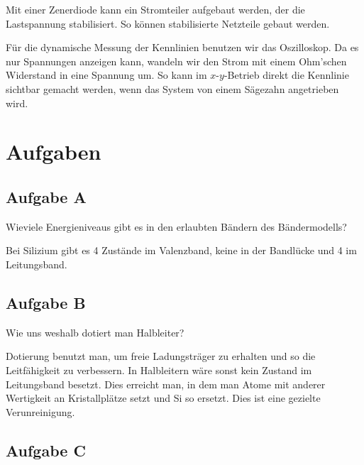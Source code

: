 Mit einer Zenerdiode kann ein Stromteiler aufgebaut werden, der die
Lastspannung stabilisiert. So können stabilisierte Netzteile gebaut werden.

Für die dynamische Messung der Kennlinien benutzen wir das Oszilloskop. Da es
nur Spannungen anzeigen kann, wandeln wir den Strom mit einem Ohm'schen
Widerstand in eine Spannung um. So kann im $x$-$y$-Betrieb direkt die Kennlinie
sichtbar gemacht werden, wenn das System von einem Sägezahn angetrieben wird.


\section{Aufgaben}

\subsection{Aufgabe A}

\begin{problem}
	Wieviele Energieniveaus gibt es in den erlaubten Bändern des Bändermodells?
\end{problem}

Bei Silizium gibt es 4 Zustände im Valenzband, keine in der Bandlücke und 4 im
Leitungsband. \cite[Vorlesung~16, Folie~13]{meschede/physik441}

\subsection{Aufgabe B}

\begin{problem}
	Wie uns weshalb dotiert man Halbleiter?
\end{problem}

Dotierung benutzt man, um freie Ladungsträger zu erhalten und so die
Leitfähigkeit zu verbessern. In Halbleitern wäre sonst kein Zustand im
Leitungsband besetzt. Dies erreicht man, in dem man Atome mit anderer
Wertigkeit an Kristallplätze setzt und Si so ersetzt. Dies ist eine gezielte
Verunreinigung.

\subsection{Aufgabe C}

